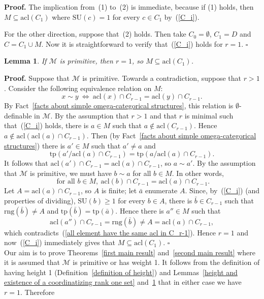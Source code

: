 \documentclass[11pt, twoside]{amsart}
\newtheorem{lem}[theor]{Lemma}
\numberwithin{equation}{section}
\newcommand{\tp}{\mathrm{tp}}
\newcommand{\acl}{\mathrm{acl}}
\newcommand{\es}{\emptyset}
\newcommand{\su}{\mathrm{SU}}
\newcommand{\mcM}{\mathcal{M}}
\newcommand{\rng}{\mathrm{rng}}
\begin{document}
\noindent
{\bf Proof.}
The implication from~(1) to~(2) is immediate, because if (1) holds, then $M \subseteq \acl(C_1)$
where $\su(c) = 1$ for every $c \in C_1$ by~(\ref{C_i}).

For the other direction, suppose that~(2) holds.
Then take $C_0 = \es$, $C_1 = D$ and $C = C_1 \cup M$.
Now it is straightforward to  verify that~(\ref{C_i}) holds for $r = 1$.
\hfill $\square$



\begin{lem}\label{r=1}
If $\mcM$ is primitive, then $r = 1$, so $M \subseteq \acl(C_1)$.
\end{lem}

\noindent
{\bf Proof.}
Suppose that $\mcM$ is primitive.
Towards a contradiction, suppose that $r > 1$.
Consider the following equivalence relation on $M$:
\[ x \sim y \ \Longleftrightarrow \ \acl(x) \cap C_{r-1} = \acl(y) \cap C_{r-1}. \]
By Fact~\ref{facts about simple omega-categorical structures}, this relation is $\es$-definable in $\mcM$.
By the assumption that $r > 1$ and that $r$ is minimal such that~(\ref{C_i}) holds,
there is $a \in M$ such that $a \notin \acl(C_{r-1})$.
Hence $a \notin \acl(\acl(a) \cap C_{r-1})$.
Then (by Fact~\ref{facts about simple omega-categorical structures})
there is $a' \in M$ such that $a' \neq a$ and
\[ \tp(a' / \acl(a) \cap C_{r-1}) = \tp(a / \acl(a) \cap C_{r-1}). \]
It follows that $\acl(a') \cap C_{r-1} = \acl(a) \cap C_{r-1}$, so $a \sim a'$.
By the assumption that $\mcM$ is primitive, we must have $b \sim a$ for all $b \in M$.
In other words,
\begin{equation}\label{all element have the same acl in C_r-1}
\text{ for all } b \in M, \ \acl(b) \cap C_{r-1} = \acl(a) \cap C_{r-1}.
\end{equation}
Let $A = \acl(a) \cap C_{r-1}$, so $A$ is finite; let $\bar{a}$ enumerate $A$.
Since, by~(\ref{C_i}) (and properties of dividing), $\su(b) \geq 1$ for every $b \in A$,
there is $\bar{b} \in C_{r-1}$ such that $\rng(\bar{b}) \neq A$ and
$\tp(\bar{b}) = \tp(\bar{a})$.
Hence there is $a'' \in M$ such that
\[ \acl(a'') \cap C_{r-1} = \rng(\bar{b}) \neq A = \acl(a) \cap C_{r-1}, \]
which contradicts~(\ref{all element have the same acl in C_r-1}).
Hence $r = 1$ and now~(\ref{C_i}) immediately gives that $M \subseteq \acl(C_1)$.
\hfill $\square$
\\

\noindent
Our aim is to prove Theorems~\ref{first main result} and~\ref{second main result} where it is assumed that
$\mcM$ is primitive or has weight 1.
It follows from the definition of having height 1 (Definition~\ref{definition of height}) and 
Lemmas~\ref{height and existence of a coordinatizing rank one set}
and~\ref{r=1} that in either case we have $r=1$. Therefore
\end{document}
